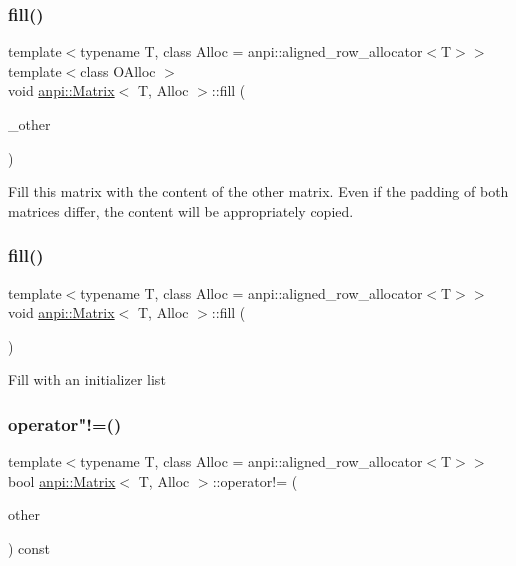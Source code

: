 \subsubsection{\texorpdfstring{fill()}{fill()}\hspace{0.1cm}{\footnotesize\ttfamily [3/4]}}
{\footnotesize\ttfamily template$<$typename T, class Alloc = anpi\+::aligned\+\_\+row\+\_\+allocator$<$\+T$>$$>$ \\
template$<$class O\+Alloc $>$ \\
void \hyperlink{classanpi_1_1Matrix}{anpi\+::\+Matrix}$<$ T, Alloc $>$\+::fill (\begin{DoxyParamCaption}\item[{const \hyperlink{classanpi_1_1Matrix}{Matrix}$<$ T, O\+Alloc $>$ \&}]{\+\_\+other }\end{DoxyParamCaption})}

Fill this matrix with the content of the other matrix. Even if the padding of both matrices differ, the content will be appropriately copied. \mbox{\label{classanpi_1_1Matrix_aeb5933e3c5fcc3a031e956f8b24dbcb7}} 
\subsubsection{\texorpdfstring{fill()}{fill()}\hspace{0.1cm}{\footnotesize\ttfamily [4/4]}}
{\footnotesize\ttfamily template$<$typename T, class Alloc = anpi\+::aligned\+\_\+row\+\_\+allocator$<$\+T$>$$>$ \\
void \hyperlink{classanpi_1_1Matrix}{anpi\+::\+Matrix}$<$ T, Alloc $>$\+::fill (\begin{DoxyParamCaption}\item[{const std\+::initializer\+\_\+list$<$ std\+::initializer\+\_\+list$<$ \hyperlink{classanpi_1_1Matrix_ad755076524c16fc494a392b0a66065cb}{value\+\_\+type} $>$ $>$ \&}]{ }\end{DoxyParamCaption})\hspace{0.3cm}{\ttfamily [private]}}

Fill with an initializer list \mbox{\label{classanpi_1_1Matrix_ac5dc646cee3d1a736acfa431076e1f37}} 
\subsubsection{\texorpdfstring{operator"!=()}{operator!=()}}
{\footnotesize\ttfamily template$<$typename T, class Alloc = anpi\+::aligned\+\_\+row\+\_\+allocator$<$\+T$>$$>$ \\
bool \hyperlink{classanpi_1_1Matrix}{anpi\+::\+Matrix}$<$ T, Alloc $>$\+::operator!= (\begin{DoxyParamCaption}\item[{const \hyperlink{classanpi_1_1Matrix}{Matrix}$<$ T, Alloc $>$ \&}]{other }\end{DoxyParamCaption}) const}

